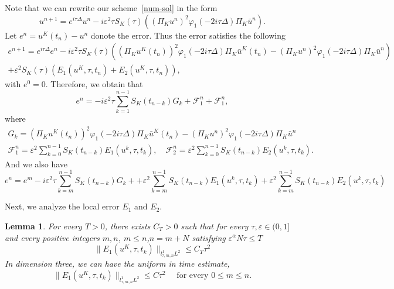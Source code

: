 \documentclass[10pt,a4paper]{article}
\newtheorem{lemma}[theorem]{Lemma}
\begin{document}
  Note that we can rewrite our scheme~\eqref{num-sol} in the form 
  \[ 
    u^{n+1} = e^{i\tau\Delta}u^n - i\varepsilon^2\tau S_K(\tau) 
    \left( (\Pi_K u^n)^2 \varphi_1(-2i\tau\Delta)\Pi_K \bar{u}^n \right).
  \]
  Let \( e^n = u^K(t_n) - u^n \) donote the error. Thus the error satisfies 
  the following 
  \begin{multline}
    e^{n+1} = e^{i\tau\Delta}e^n - i \varepsilon^2 \tau S_K(\tau) \left( 
    \left(\Pi_K u^K(t_n)\right)^2 \varphi_1(-2i\tau\Delta)\Pi_K \bar{u}^K(t_n)
    - (\Pi_K u^n)^2 \varphi_1(-2i\tau\Delta)\Pi_K \bar{u}^n \right) \\ 
    + \varepsilon^2 S_K(\tau) \left( E_1(u^K, \tau, t_n) + E_2(u^K, \tau, t_n) 
    \right),
  \end{multline}
  with \( e^0 = 0 \). Therefore, we obtain that 
  \begin{equation}
    e^n = -i \varepsilon^2 \tau \sum_{k=1}^{n-1}
    S_K(t_{n-k})G_k + \mathcal F_1^{n} + \mathcal F_1^{n},
  \end{equation}
  where
  \begin{align}
    \label{Gk} G_k = \left(\Pi_K u^K(t_n)\right)^2 \varphi_1(-2i\tau\Delta)\Pi_K 
    \bar{u}^K(t_n) - (\Pi_K u^n)^2 \varphi_1(-2i\tau\Delta)\Pi_K \bar{u}^n \\
    \label{F1F2} \mathcal F^{n}_1 = \varepsilon^2 \sum_{k=0}^{n-1} S_K(t_{n-k}) E_1(u^k, \tau, t_k), \quad
    \mathcal F^{n}_2 = \varepsilon^2 \sum_{k=0}^{n-1} S_K(t_{n-k}) E_2(u^k, \tau, t_k).
  \end{align}
  And we also have 
  \begin{equation}\label{emn}
    e^n = e^m -i \varepsilon^2 \tau \sum_{k=m}^{n-1}
    S_K(t_{n-k})G_k + 
    + \varepsilon^2 \sum_{k=m}^{n-1} S_K(t_{n-k}) E_1(u^k, \tau, t_k)
    + \varepsilon^2 \sum_{k=m}^{n-1} S_K(t_{n-k}) E_2(u^k, \tau, t_k)
  \end{equation}
  
  Next, we analyze the local error \(E_1\) and \(E_2\).

  \begin{lemma}\label{lemE1} %
    For every \( T > 0 \),
    there exists \(C_T>0\) such that for every \( \tau, \varepsilon
    \in (0,1] \) and every positive integers \(m,n\), \(m \leq n\),\(n=m+N\)
    satisfying \(\varepsilon^\alpha N\tau \leq T\)
    \begin{equation}
      \|E_1(u^K,\tau,t_k)\|_{l^1_{\tau,m,n}L^2} \leq C_T \tau^2
    \end{equation}
    In dimension three, we can have the uniform in time estimate,
    \begin{equation}
      \|E_1(u^K,\tau,t_k)\|_{l^1_{\tau,m,n}L^2} \leq C \tau^2 \quad \text{ for
      every } 0 \leq m \leq n.
    \end{equation}
  \end{lemma}
\end{document}
